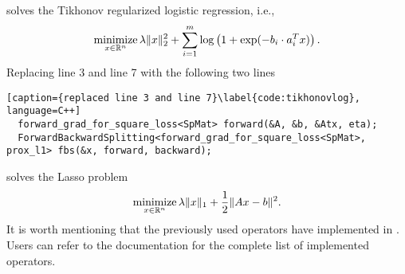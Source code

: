 solves the Tikhonov regularized logistic regression, i.e.,
$$\operatorname*{minimize}_{x \in \mathbb{R}^n} \lambda \|x\|_2^2 + \sum_{i = 1}^m \log\left(1 + \exp(-b_i \cdot a_i^T x)\right).$$
Replacing line 3 and line 7 with
the following two lines
\begin{lstlisting}[caption={replaced line 3 and line 7}\label{code:tikhonovlog}, language=C++]
  forward_grad_for_square_loss<SpMat> forward(&A, &b, &Atx, eta);
  ForwardBackwardSplitting<forward_grad_for_square_loss<SpMat>, prox_l1> fbs(&x, forward, backward);
\end{lstlisting}
solves the Lasso problem
$$\operatorname*{minimize}_{x \in \mathbb{R}^n} \lambda \|x\|_1 + \frac{1}{2}\|A x - b\|^2.$$
It is worth mentioning that the previously used operators have implemented in \pkg. Users can refer to the documentation for
the complete list of implemented operators.

